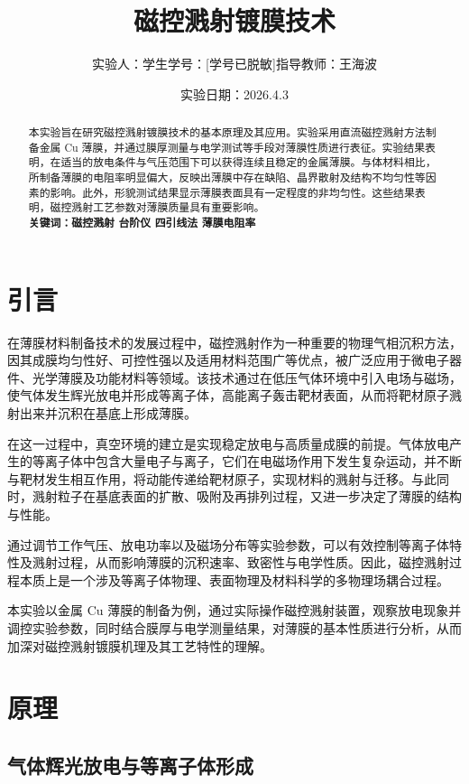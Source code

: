 \documentclass[a4paper, 1.5lines]{ctexart}
\title{磁控溅射镀膜技术}
\author{实验人：学生\qquad 学号：[学号已脱敏]\qquad 指导教师：王海波}
\date{实验日期：2026.4.3}
\begin{document}
    
    \maketitle
    
    \begin{abstract}
         本实验旨在研究磁控溅射镀膜技术的基本原理及其应用。实验采用直流磁控溅射方法制备金属 Cu 薄膜，并通过膜厚测量与电学测试等手段对薄膜性质进行表征。实验结果表明，在适当的放电条件与气压范围下可以获得连续且稳定的金属薄膜。与体材料相比，所制备薄膜的电阻率明显偏大，反映出薄膜中存在缺陷、晶界散射及结构不均匀性等因素的影响。此外，形貌测试结果显示薄膜表面具有一定程度的非均匀性。这些结果表明，磁控溅射工艺参数对薄膜质量具有重要影响。\\
    \textbf{\textbf{关键词：磁控溅射 \quad 台阶仪 \quad 四引线法 \quad 薄膜电阻率}}
    \end{abstract}
    
    \section{引言}
    在薄膜材料制备技术的发展过程中，磁控溅射作为一种重要的物理气相沉积方法，因其成膜均匀性好、可控性强以及适用材料范围广等优点，被广泛应用于微电子器件、光学薄膜及功能材料等领域。该技术通过在低压气体环境中引入电场与磁场，使气体发生辉光放电并形成等离子体，高能离子轰击靶材表面，从而将靶材原子溅射出来并沉积在基底上形成薄膜。

    在这一过程中，真空环境的建立是实现稳定放电与高质量成膜的前提。气体放电产生的等离子体中包含大量电子与离子，它们在电磁场作用下发生复杂运动，并不断与靶材发生相互作用，将动能传递给靶材原子，实现材料的溅射与迁移。与此同时，溅射粒子在基底表面的扩散、吸附及再排列过程，又进一步决定了薄膜的结构与性能。

    通过调节工作气压、放电功率以及磁场分布等实验参数，可以有效控制等离子体特性及溅射过程，从而影响薄膜的沉积速率、致密性与电学性质。因此，磁控溅射过程本质上是一个涉及等离子体物理、表面物理及材料科学的多物理场耦合过程。

    本实验以金属 Cu 薄膜的制备为例，通过实际操作磁控溅射装置，观察放电现象并调控实验参数，同时结合膜厚与电学测量结果，对薄膜的基本性质进行分析，从而加深对磁控溅射镀膜机理及其工艺特性的理解。

    \section{原理}
        \subsection{气体辉光放电与等离子体形成}
\end{document}
